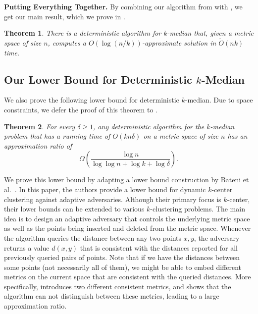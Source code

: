 \documentclass[11pt]{article}
\newcommand{\1}{\mathmybb{1}}
\newtheorem{theorem}{Theorem}[section]
\begin{document}
\medskip
\noindent \textbf{Putting Everything Together.} By combining our algorithm from  with , we get our main result, which we prove in .

\begin{theorem}\label{thm:main:fast:restattet}
    There is a deterministic algorithm for $k$-median that, given a metric space of size $n$, computes a $O(\log(n/k))$-approximate solution in $\tilde O(nk)$ time.
\end{theorem}

\subsection{Our Lower Bound for Deterministic $k$-Median}

We also prove the following lower bound for deterministic $k$-median. Due to space constraints, we defer the proof of this theorem to .

\begin{theorem}
    For every $\delta \geq 1$, any deterministic algorithm for the $k$-median problem that has a running time of $O(kn\delta)$ on a metric space of size $n$ has an approximation ratio of
    $$ \Omega \! \left( \frac{\log n}{\log\log n + \log k + \log \delta} \right). $$
\end{theorem}

We prove this lower bound by adapting a lower bound construction by Bateni et al.~\cite{BateniEFHJMW23}.
In this paper, the authors provide a lower bound for dynamic $k$-center clustering against adaptive adversaries.
Although their primary focus is $k$-center, their lower bounds can be extended to various $k$-clustering problems.
The main idea is to design an adaptive adversary that controls the underlying metric space as well as the points being inserted and deleted from the metric space.
Whenever the algorithm queries the distance between any two points $x,y$, the adversary returns a value $d(x,y)$ that is consistent with the distances reported for all previously queried pairs of points.
Note that if we have the distances between some points (not necessarily all of them), we might be able to embed different metrics on the current space that are consistent with the queried distances.
More specifically, \cite{BateniEFHJMW23} introduces two different consistent metrics, and shows that the algorithm can not distinguish between these metrics, leading to a large approximation ratio.
\end{document}
